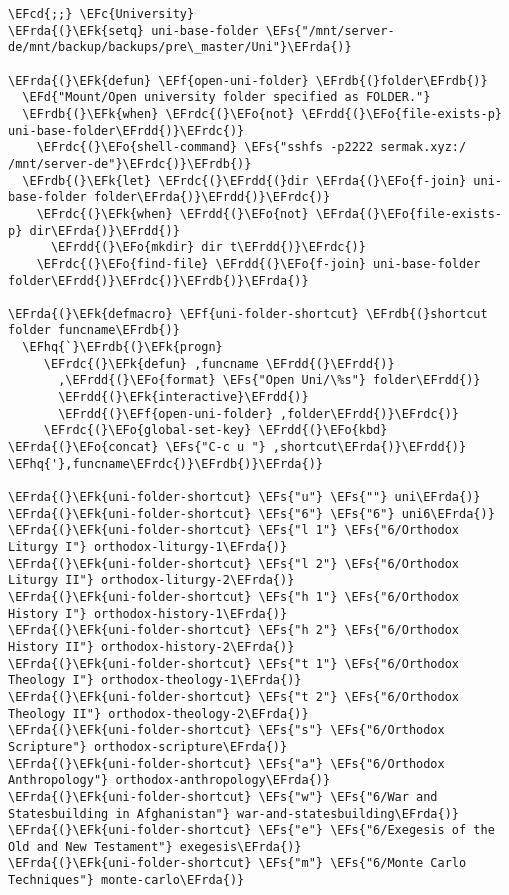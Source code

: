 \documentclass[a4wide,10pt]{article}
\newcommand{\EFc}[1]{\textcolor{EFc}{#1}} %
\newcommand{\EFcd}[1]{\textcolor{EFcd}{#1}} %
\newcommand{\EFs}[1]{\textcolor{EFs}{#1}} %
\newcommand{\EFd}[1]{\textcolor{EFd}{#1}} %
\newcommand{\EFk}[1]{\textcolor{EFk}{#1}} %
\newcommand{\EFf}[1]{\textcolor{EFf}{#1}} %
\newcommand{\EFo}[1]{\textcolor{EFo}{#1}} %
\newcommand{\EFhq}[1]{\textcolor{EFhq}{#1}} %
\newcommand{\EFrda}[1]{\textcolor{EFrda}{#1}} %
\newcommand{\EFrdb}[1]{\textcolor{EFrdb}{#1}} %
\newcommand{\EFrdc}[1]{\textcolor{EFrdc}{#1}} %
\newcommand{\EFrdd}[1]{\textcolor{EFrdd}{#1}} %
\begin{document}
\begin{Code}
\begin{Verbatim}
\EFcd{;;} \EFc{University}
\EFrda{(}\EFk{setq} uni-base-folder \EFs{"/mnt/server-de/mnt/backup/backups/pre\_master/Uni"}\EFrda{)}

\EFrda{(}\EFk{defun} \EFf{open-uni-folder} \EFrdb{(}folder\EFrdb{)}
  \EFd{"Mount/Open university folder specified as FOLDER."}
  \EFrdb{(}\EFk{when} \EFrdc{(}\EFo{not} \EFrdd{(}\EFo{file-exists-p} uni-base-folder\EFrdd{)}\EFrdc{)}
    \EFrdc{(}\EFo{shell-command} \EFs{"sshfs -p2222 sermak.xyz:/ /mnt/server-de"}\EFrdc{)}\EFrdb{)}
  \EFrdb{(}\EFk{let} \EFrdc{(}\EFrdd{(}dir \EFrda{(}\EFo{f-join} uni-base-folder folder\EFrda{)}\EFrdd{)}\EFrdc{)}
    \EFrdc{(}\EFk{when} \EFrdd{(}\EFo{not} \EFrda{(}\EFo{file-exists-p} dir\EFrda{)}\EFrdd{)}
      \EFrdd{(}\EFo{mkdir} dir t\EFrdd{)}\EFrdc{)}
    \EFrdc{(}\EFo{find-file} \EFrdd{(}\EFo{f-join} uni-base-folder folder\EFrdd{)}\EFrdc{)}\EFrdb{)}\EFrda{)}

\EFrda{(}\EFk{defmacro} \EFf{uni-folder-shortcut} \EFrdb{(}shortcut folder funcname\EFrdb{)}
  \EFhq{`}\EFrdb{(}\EFk{progn}
     \EFrdc{(}\EFk{defun} ,funcname \EFrdd{(}\EFrdd{)}
       ,\EFrdd{(}\EFo{format} \EFs{"Open Uni/\%s"} folder\EFrdd{)}
       \EFrdd{(}\EFk{interactive}\EFrdd{)}
       \EFrdd{(}\EFf{open-uni-folder} ,folder\EFrdd{)}\EFrdc{)}
     \EFrdc{(}\EFo{global-set-key} \EFrdd{(}\EFo{kbd} \EFrda{(}\EFo{concat} \EFs{"C-c u "} ,shortcut\EFrda{)}\EFrdd{)} \EFhq{'},funcname\EFrdc{)}\EFrdb{)}\EFrda{)}

\EFrda{(}\EFk{uni-folder-shortcut} \EFs{"u"} \EFs{""} uni\EFrda{)}
\EFrda{(}\EFk{uni-folder-shortcut} \EFs{"6"} \EFs{"6"} uni6\EFrda{)}
\EFrda{(}\EFk{uni-folder-shortcut} \EFs{"l 1"} \EFs{"6/Orthodox Liturgy I"} orthodox-liturgy-1\EFrda{)}
\EFrda{(}\EFk{uni-folder-shortcut} \EFs{"l 2"} \EFs{"6/Orthodox Liturgy II"} orthodox-liturgy-2\EFrda{)}
\EFrda{(}\EFk{uni-folder-shortcut} \EFs{"h 1"} \EFs{"6/Orthodox History I"} orthodox-history-1\EFrda{)}
\EFrda{(}\EFk{uni-folder-shortcut} \EFs{"h 2"} \EFs{"6/Orthodox History II"} orthodox-history-2\EFrda{)}
\EFrda{(}\EFk{uni-folder-shortcut} \EFs{"t 1"} \EFs{"6/Orthodox Theology I"} orthodox-theology-1\EFrda{)}
\EFrda{(}\EFk{uni-folder-shortcut} \EFs{"t 2"} \EFs{"6/Orthodox Theology II"} orthodox-theology-2\EFrda{)}
\EFrda{(}\EFk{uni-folder-shortcut} \EFs{"s"} \EFs{"6/Orthodox Scripture"} orthodox-scripture\EFrda{)}
\EFrda{(}\EFk{uni-folder-shortcut} \EFs{"a"} \EFs{"6/Orthodox Anthropology"} orthodox-anthropology\EFrda{)}
\EFrda{(}\EFk{uni-folder-shortcut} \EFs{"w"} \EFs{"6/War and Statesbuilding in Afghanistan"} war-and-statesbuilding\EFrda{)}
\EFrda{(}\EFk{uni-folder-shortcut} \EFs{"e"} \EFs{"6/Exegesis of the Old and New Testament"} exegesis\EFrda{)}
\EFrda{(}\EFk{uni-folder-shortcut} \EFs{"m"} \EFs{"6/Monte Carlo Techniques"} monte-carlo\EFrda{)}


\end{Verbatim}
\end{Code}
\end{document}
